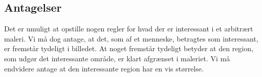 {\subsection{Antagelser}
Det er umuligt at opstille nogen regler for hvad der er interessant i et
arbitrært maleri. Vi må dog antage, at det, som af et menneske, betragtes
som interessant, er fremstår tydeligt i billedet. At noget fremstår
tydeligt betyder at den region, som udgør det interessante område, er
klart afgrænset i maleriet. Vi må endvidere antage at den interessante
region har en vis størrelse.

}


